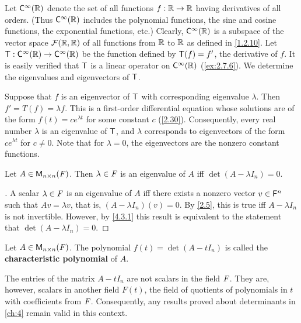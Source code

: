 \begin{eg}\label{5.1.4}
  Let \(\cfs[\infty](\R)\) denote the set of all functions \(f : \mathbb{R} \to \mathbb{R}\) having derivatives of all orders.
  (Thus \(\cfs[\infty](\R)\) includes the polynomial functions, the sine and cosine functions, the exponential functions, etc.)
  Clearly, \(\cfs[\infty](\R)\) is a subspace of the vector space \(\mathcal{F}(\mathbb{R}, \mathbb{R})\) of all functions from \(\mathbb{R}\) to \(\mathbb{R}\) as defined in \cref{1.2.10}.
  Let \(\T : \cfs[\infty](\R) \to \cfs[\infty](\R)\) be the function defined by \(\mathsf{T}(f) = f'\), the derivative of \(f\).
  It is easily verified that \(\mathsf{T}\) is a linear operator on \(\cfs[\infty](\R)\) (\cref{ex:2.7.6}).
  We determine the eigenvalues and eigenvectors of \(\mathsf{T}\).

  Suppose that \(f\) is an eigenvector of \(\mathsf{T}\) with corresponding eigenvalue \(\lambda\).
  Then \(f' = T(f) = \lambda f\).
  This is a first-order differential equation whose solutions are of the form \(f(t) = ce^{\lambda t}\) for some constant \(c\) (\cref{2.30}).
  Consequently, every real number \(\lambda\) is an eigenvalue of \(\mathsf{T}\), and \(\lambda\) corresponds to eigenvectors of the form \(ce^{\lambda t}\) for \(c \neq 0\).
  Note that for \(\lambda = 0\), the eigenvectors are the nonzero constant functions.
\end{eg}

\begin{thm}\label{5.2}
  Let \(A \in \ms[n][n][\F]\).
  Then \(\lambda \in \mathit{F}\) is an eigenvalue of \(A\) iff \(\det(A - \lambda I_n) = 0\).
\end{thm}

\begin{proof}[]
  A scalar \(\lambda \in \mathit{F}\) is an eigenvalue of \(A\) iff there exists a nonzero vector \(v \in \mathsf{F}^n\) such that \(Av = \lambda v\), that is, \((A - \lambda I_n)(v) = 0\).
  By \cref{2.5}, this is true iff \(A - \lambda I_n\) is not invertible.
  However, by \cref{4.3.1} this result is equivalent to the statement that \(\det(A - \lambda I_n) = 0\).
\end{proof}

\begin{defn}\label{5.1.5}
  Let \(A \in \ms[n][n][\F]\).
  The polynomial \(f(t) = \det(A - t I_n)\) is called the \textbf{characteristic polynomial} of \(A\).
\end{defn}

\begin{note}
  The entries of the matrix \(A - t I_n\) are not scalars in the field \(\mathit{F}\).
  They are, however, scalars in another field \(F(t)\), the field of quotients of polynomials in \(t\) with coefficients from \(\mathit{F}\).
  Consequently, any results proved about determinants in \cref{ch:4} remain valid in this context.
\end{note}

